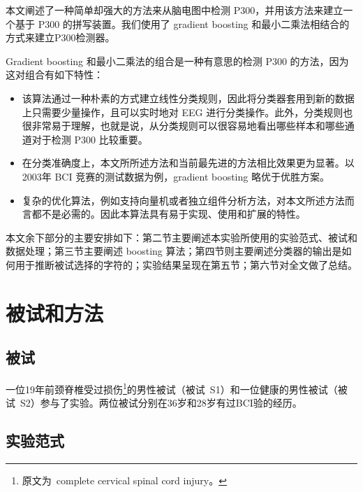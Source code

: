 \documentclass[a4paper]{ecusttrans}
\begin{document}
  本文阐述了一种简单却强大的方法来从脑电图中检测 P300，并用该方法来建立一个基于 P300 的拼写装置。我们使用了 gradient boosting 和最小二乘法相结合的方式来建立P300检测器。

  Gradient boosting 和最小二乘法的组合是一种有意思的检测 P300 的方法，因为这对组合有如下特性：

  \begin{itemize}
    \item 该算法通过一种朴素的方式建立线性分类规则，因此将分类器套用到新的数据上只需要少量操作，且可以实时地对 EEG 进行分类操作。此外，分类规则也很非常易于理解，也就是说，从分类规则可以很容易地看出哪些样本和哪些通道对于检测 P300 比较重要。
    \item 在分类准确度上，本文所所述方法和当前最先进的方法相比效果更为显著。以2003年 BCI 竞赛的测试数据为例，gradient boosting 略优于优胜方案。
    \item 复杂的优化算法，例如支持向量机或者独立组件分析方法，对本文所述方法而言都不是必需的。因此本算法具有易于实现、使用和扩展的特性。
  \end{itemize}

  本文余下部分的主要安排如下：第二节主要阐述本实验所使用的实验范式、被试和数据处理；第三节主要阐述 boosting 算法；第四节则主要阐述分类器的输出是如何用于推断被试选择的字符的；实验结果呈现在第五节；第六节对全文做了总结。
  \section{被试和方法}
  \subsection{被试}
  一位19年前颈脊椎受过损伤\footnote{原文为~complete cervical spinal cord injury。}的男性被试（被试~S1）和一位健康的男性被试（被试~S2）参与了实验。两位被试分别在36岁和28岁有过BCI验的经历。
  \subsection{实验范式}
\end{document}
